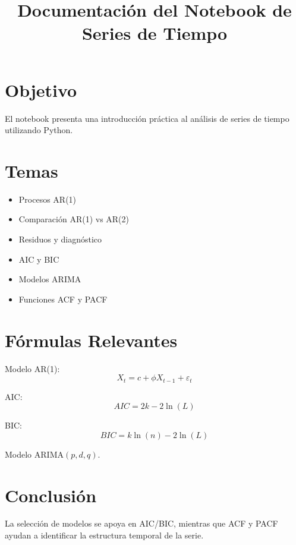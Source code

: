 \documentclass[11pt]{article}
\title{Documentación del Notebook de Series de Tiempo}
\date{}
\begin{document}
\maketitle

\section{Objetivo}
El notebook presenta una introducción práctica al análisis de series de tiempo utilizando Python.

\section{Temas}
\begin{itemize}
\item Procesos AR(1)
\item Comparación AR(1) vs AR(2)
\item Residuos y diagnóstico
\item AIC y BIC
\item Modelos ARIMA
\item Funciones ACF y PACF
\end{itemize}

\section{Fórmulas Relevantes}

Modelo AR(1):
\[
X_t = c + \phi X_{t-1} + \varepsilon_t
\]

AIC:
\[
AIC = 2k - 2\ln(L)
\]

BIC:
\[
BIC = k\ln(n) - 2\ln(L)
\]

Modelo ARIMA$(p,d,q)$.

\section{Conclusión}
La selección de modelos se apoya en AIC/BIC, mientras que ACF y PACF ayudan a identificar la estructura temporal de la serie.
\end{document}
